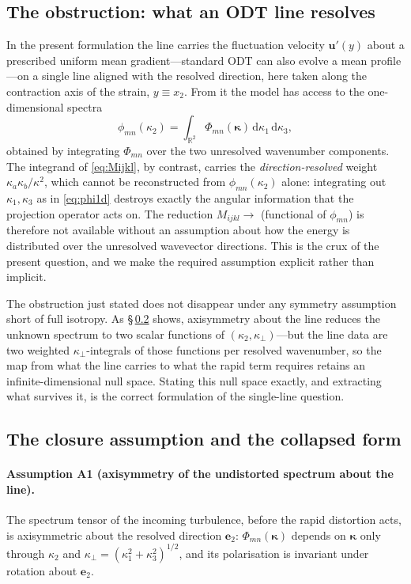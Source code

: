 \documentclass[lineno]{JFM-FLM_Au}
\begin{document}
\subsection{The obstruction: what an ODT line resolves}\label{sec:obstruction}

In the present formulation the line carries the fluctuation velocity
$\boldsymbol{u}'(y)$ about a prescribed uniform mean gradient---standard
ODT can also evolve a mean profile---on a single line aligned
with the resolved direction, here taken along the contraction axis of the
strain, $y\equiv x_2$. From it the model has access to the one-dimensional
spectra
\begin{equation}
  \phi_{mn}(\kappa_2)
  = \int_{\mathbb{R}^2}
      \Phi_{mn}(\boldsymbol{\kappa})\,
      \mathrm{d}\kappa_1\,\mathrm{d}\kappa_3,
  \label{eq:phi1d}
\end{equation}
obtained by integrating $\Phi_{mn}$ over the two
unresolved wavenumber components. The integrand of \eqref{eq:Mijkl}, by
contrast, carries the \emph{direction-resolved} weight
$\kappa_a\kappa_b/\kappa^2$, which cannot be reconstructed from
$\phi_{mn}(\kappa_2)$ alone: integrating out $\kappa_1,\kappa_3$ as in
\eqref{eq:phi1d} destroys exactly the angular information that the projection
operator acts on. The reduction $M_{ijkl}\!\to\!$ (functional of
$\phi_{mn}$) is therefore not available without an assumption about how the
energy is distributed over the unresolved wavevector directions. This is the
crux of the present question, and we make the required assumption explicit
rather than implicit.

The obstruction just stated does not disappear under any symmetry
assumption short of full isotropy. As \S\,\ref{sec:assumption} shows,
axisymmetry about the line reduces the unknown spectrum to two scalar
functions of $(\kappa_2,\kappa_\perp)$---but the line data are two weighted
$\kappa_\perp$-integrals of those functions per resolved wavenumber, so the
map from what the line carries to what the rapid term requires retains an
infinite-dimensional null space. Stating this null space exactly, and
extracting what survives it, is the correct formulation of the single-line
question.

\subsection{The closure assumption and the collapsed form}
\label{sec:assumption}

\paragraph{Assumption A1 (axisymmetry of the undistorted spectrum about the
line).} The spectrum tensor of the incoming turbulence, before the rapid
distortion acts, is axisymmetric about the resolved direction $\boldsymbol{e}_2$:
$\Phi_{mn}(\boldsymbol{\kappa})$ depends on $\boldsymbol{\kappa}$ only through
$\kappa_2$ and $\kappa_\perp=(\kappa_1^2+\kappa_3^2)^{1/2}$, and its
polarisation is invariant under rotation about $\boldsymbol{e}_2$.
\end{document}
